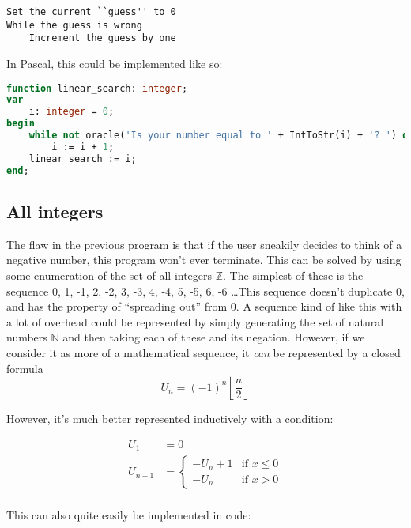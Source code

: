 \documentclass{article}
\begin{document}
\begin{lstlisting}[caption=Linear search on $\mathbb{N}$ pseudocode]
Set the current ``guess'' to 0
While the guess is wrong
    Increment the guess by one
\end{lstlisting}

    In Pascal, this could be implemented like so:

\begin{lstlisting}[language=Pascal, caption=Linear search on $\mathbb{N}$ implementation]
function linear_search: integer;
var
    i: integer = 0;
begin
    while not oracle('Is your number equal to ' + IntToStr(i) + '? ') do
        i := i + 1;
    linear_search := i;
end;
\end{lstlisting}

    \subsection{All integers}
    The flaw in the previous program is that if the user sneakily decides to
    think of a negative number, this program won't ever terminate. This can be
    solved by using some enumeration of the set of all integers $\mathbb{Z}$.
    The simplest of these is the sequence 0, 1, -1, 2, -2, 3, -3, 4, -4, 5, -5,
    6, -6 \ldots This sequence doesn't duplicate 0, and has the property of
    ``spreading out'' from 0. A sequence kind of like this with a lot of
    overhead could be represented by simply generating the set of natural
    numbers $\mathbb{N}$ and then taking each of these and its negation. However,
    if we consider it as more of a mathematical sequence, it \textit{can} be
    represented by a closed formula
    \begin{equation}
    U_n = (-1)^n \left\lfloor \frac{n}{2} \right\rfloor
    \end{equation}

    However, it's much better represented inductively with a condition:

    \begin{align*}
        U_1 &= 0\\
        U_{n + 1} &= 
        \begin{cases}
            -U_n + 1        & \text{if } x \leq 0\\
            -U_n            & \text{if } x > 0
        \end{cases}\\
    \end{align*}

    This can also quite easily be implemented in code:
\end{document}
